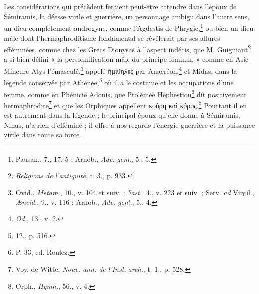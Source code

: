 \documentclass[a4paper, 11pt, oneside]{article}
\begin{document}
\bigskip \centerline{\EightStarTaper} \centerline{\EightStarTaper\EightStarTaper} \bigskip\clearpage
\section{}
\paragraph{}
Les considérations qui précèdent feraient peut-être attendre dans l'époux de Sémiramis, la déesse virile et guerrière, un personnage ambigu dans l'autre sens, un dieu complétement androgyne, comme l'Agdestis de Phrygie,\footnote{Pausan., 7., 17, 5 ; Arnob., \emph{Adv. gent.}, 5., 5.} ou bien un dieu mâle dont l'hermaphroditisme fondamental se révélerait par ses allures efféminées, comme chez les Grecs Dionysus à l'aspect indécis, que M. Guigniaut\footnote{\emph{Religions de l'antiquité}, t. 3., p. 933.} a si bien défini « la personnification mâle du principe féminin, » comme en Asie Mineure Atys l'émasculé,\footnote{Ovid., \emph{Metam.}, 10., v. 104 et suiv. ; \emph{Fast.}, 4., v. 223 et suiv. ; Serv. \emph{ad} Virgil., \emph{Æneid.}, 9., v. 116 ; Arnob., \emph{Adv. gent.}, 5., 4.} appelé ἠμίθηλυς par Anacréon,\footnote{\emph{Od.}, 13., v. 2.} et Midas, dans la légende conservée par Athénée,\footnote{12., p. 516.} où il a le costume et les occupations d'une femme, comme en Phénicie Adonis, que Ptolémée Héphestion\footnote{P. 33, ed. Roulez.} dit positivement hermaphrodite\footnote{Voy. de Witte, \emph{Nouv. ann. de l'Inst. arch.}, t. 1., p. 528.} et que les Orphiques appellent κοὑρη καὶ κόρος.\footnote{Orph., \emph{Hymn.}, 56., v. 4.} Pourtant il en est autrement dans la légende ; le principal époux qu'elle donne à Sémiramis, Ninus, n'a rien d'efféminé ; il offre à nos regards l'énergie guerrière et la puissance virile dans toute sa force.
\end{document}
